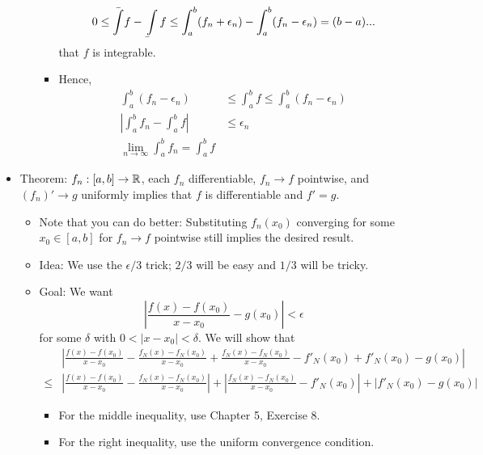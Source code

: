\documentclass[../notes.tex]{subfiles}
\begin{document}
\begin{itemize}
\begin{itemize}
\begin{itemize}
            \begin{equation*}
                0 \leq \bar{\int}f-\underaccent{\bar}{\int}f
                \leq \int_a^b(f_n+\epsilon_n)-\int_a^b(f_n-\epsilon_n)
                = (b-a)...
            \end{equation*}
            that $f$ is integrable.
            \item Hence,
            \begin{align*}
                \int_a^b(f_n-\epsilon_n) &\leq \int_a^bf \leq \int_a^b(f_n-\epsilon_n)\\
                \left| \int_a^bf_n-\int_a^bf \right| &\leq \epsilon_n\\
                \lim_{n\to\infty}\int_a^bf_n = \int_a^bf
            \end{align*}
        \end{itemize}
    \end{itemize}
    \item Theorem: $f_n:[a,b]\to\mathbb{R}$, each $f_n$ differentiable, $f_n\to f$ pointwise, and $(f_n)'\to g$ uniformly implies that $f$ is differentiable and $f'=g$.
    \begin{itemize}
        \item Note that you can do better: Substituting $f_n(x_0)$ converging for some $x_0\in[a,b]$ for $f_n\to f$ pointwise still implies the desired result.
        \item Idea: We use the $\epsilon/3$ trick; $2/3$ will be easy and $1/3$ will be tricky.
        \item Goal: We want
        \begin{equation*}
            \left| \frac{f(x)-f(x_0)}{x-x_0}-g(x_0) \right| < \epsilon
        \end{equation*}
        for some $\delta$ with $0<|x-x_0|<\delta$. We will show that
        \begin{align*}
            {}& \left| \frac{f(x)-f(x_0)}{x-x_0}-\frac{f_N(x)-f_N(x_0)}{x-x_0}+\frac{f_N(x)-f_N(x_0)}{x-x_0}-f'_N(x_0)+f'_N(x_0)-g(x_0) \right|\\
            \leq{}& \left| \frac{f(x)-f(x_0)}{x-x_0}-\frac{f_N(x)-f_N(x_0)}{x-x_0} \right|+\left| \frac{f_N(x)-f_N(x_0)}{x-x_0}-f'_N(x_0) \right|+\left| f'_N(x_0)-g(x_0) \right|
        \end{align*}
        \begin{itemize}
            \item For the middle inequality, use Chapter 5, Exercise 8.
            \item For the right inequality, use the uniform convergence condition.

\end{itemize}
\end{itemize}
\end{itemize}
\end{document}
